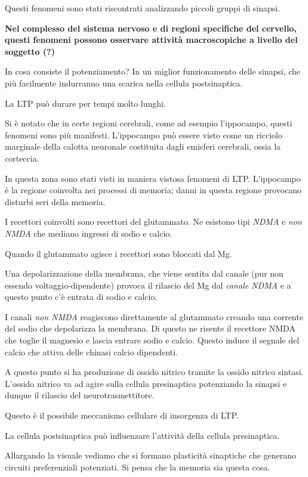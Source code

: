 \documentclass[]{article}
\begin{document}
Questi fenomeni sono stati riscontrati analizzando piccoli gruppi di
sinapsi.

\textbf{Nel complesso del sistema nervoso e di regioni specifiche del
cervello, questi fenomeni possono osservare attività macroscopiche a
livello del soggetto (?)}

In cosa consiste il potenziamento? In un miglior funzionamento delle
sinapsi, che più facilmente indurranno una scarica nella cellula
postsinaptica.

La LTP può durare per tempi molto lunghi.

Si è notato che in certe regioni cerebrali, come ad esempio l'ippocampo,
questi fenomeni sono più manifesti. L'ippocampo può essere visto come un
ricciolo marginale della calotta neuronale costituita dagli emisferi
cerebrali, ossia la corteccia.

In questa zona sono stati visti in maniera vistosa fenomeni di LTP.
L'ippocampo è la regione coinvolta nei processi di memoria; danni in
questa regione provocano disturbi seri della memoria.

I recettori coinvolti sono recettori del glutammato. Ne esistono tipi
\emph{NDMA} e \emph{non NMDA} che mediano ingressi di sodio e calcio.

Quando il glutammato agisce i recettori sono bloccati dal Mg.

Una depolarizzazione della membrana, che viene sentita dal canale (pur
non essendo voltaggio-dipendente) provoca il rilascio del Mg dal
\emph{canale NDMA} e a questo punto c'è entrata di sodio e calcio.

I canali \emph{non NMDA} reagiscono direttamente al glutammato creando
una corrente del sodio che depolarizza la membrana. Di questo ne risente
il recettore NMDA che toglie il magnesio e lascia entrare sodio e
calcio. Questo induce il segnale del calcio che attiva delle chinasi
calcio dipendenti.

A questo punto si ha produzione di ossido nitrico tramite la ossido
nitrico sintasi. L'ossido nitrico va ad agire sulla cellula presinaptica
potenziando la sinapsi e dunque il rilascio del neurotrasmettitore.

Questo è il possibile meccanismo cellulare di insorgenza di LTP.

La cellula postsinaptica può influenzare l'attività della cellula
presinaptica.

Allargando la visuale vediamo che si formano plasticità sinaptiche che
generano circuiti preferenziali potenziati. Si pensa che la memoria sia
questa cosa.
\end{document}
